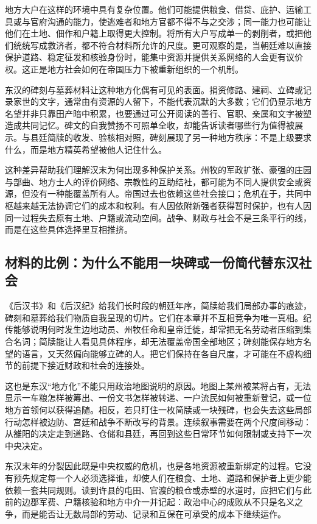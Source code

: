 地方大户在这样的环境中具有复杂位置。他们可能提供粮食、借贷、庇护、运输工具或与官府沟通的能力，使逃难者和地方官都不得不与之交涉；同一能力也可能让他们在土地、佃作和户籍上取得更大控制。将所有大户写成单一的剥削者，或把他们统统写成救济者，都不符合材料所允许的尺度。更可观察的是，当朝廷难以直接保护道路、稳定征发和核验身份时，能集中资源并提供关系网络的人会更有议价权。这正是地方社会如何在帝国压力下被重新组织的一个机制。

东汉的碑刻与墓葬材料让这种地方化偶有可见的表面。捐资修路、建祠、立碑或记录家世的文字，通常由有资源的人留下，不能代表沉默的大多数；它们仍显示地方名望并非只靠田产暗中积累，也要通过可公开阅读的善行、官职、亲属和文字被塑造成共同记忆。碑文的自我赞扬不可照单全收，却能告诉读者哪些行为值得被展示。与县廷简牍的收发、验核相对照，碑刻展现了另一种地方秩序：不是上级要求什么，而是地方精英希望被他人记住什么。

这种差异帮助我们理解汉末为何出现多种保护关系。州牧的军政扩张、豪强的庄园与部曲、地方士人的评价网络、宗教性的互助结社，都可能为不同人提供安全或资源，但没有一种能覆盖所有人。帝国过去也依赖这些社会接口；危机在于，共同中枢越来越无法协调它们的成本和权利。有人因依附新强者获得暂时保护，也有人因同一过程失去原有土地、户籍或流动空间。战争、财政与社会不是三条平行的线，而是在这些具体选择里互相推挤。

\subsection{材料的比例：为什么不能用一块碑或一份简代替东汉社会}

《后汉书》和《后汉纪》给我们长时段的朝廷年序，简牍给我们局部办事的痕迹，碑刻和墓葬给我们物质自我呈现的切片。它们在本章并不互相竞争为唯一真相。纪传能够说明何时发生边地动员、州牧任命和皇帝迁徙，却常把无名劳动者压缩到集合名词；简牍能让人看见具体程序，却无法覆盖帝国全部地区；碑刻能保存地方名望的语言，又天然偏向能够立碑的人。把它们保持在各自尺度，才可能在不虚构细节的前提下接近财政和社会的连接处。

这也是东汉“地方化”不能只用政治地图说明的原因。地图上某州被某将占有，无法显示一车粮怎样被筹出、一份文书怎样被转递、一户流民如何被重新登记，或一位地方首领何以获得追随。相反，若只盯住一枚简牍或一块残碑，也会失去这些局部行动怎样被边防、宫廷和战争不断改写的背景。连续叙事需要在两个尺度间移动：从雒阳的决定走到道路、仓储和县廷，再回到这些日常环节如何限制或支持下一次中央决定。

东汉末年的分裂因此既是中央权威的危机，也是各地资源被重新绑定的过程。它没有预先规定每一个人必须选择谁，却使人们在粮食、土地、道路和保护者上更少能依赖一套共同规则。读到许县的屯田、官渡的粮仓或赤壁的水道时，应把它们与此前的边郡军费、户籍核验和地方中介一并记起：政治中心的成败从不只是名义之争，而是能否让无数局部的劳动、记录和互保在可承受的成本下继续运作。

